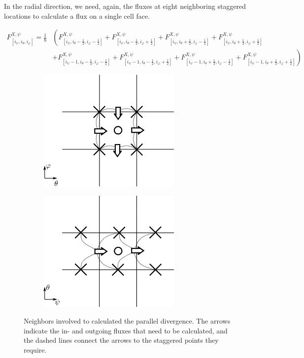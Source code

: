 In the radial direction, we need, again, the fluxes at eight neighboring staggered locations to calculate a flux on a single cell face. 

\begin{align*}
	F_{[i_\psi,i_\theta, i_\varphi]}^{X,\psi} = \frac{1}{8}&\left(
	F_{[i_\psi,i_\theta-\frac{1}{2}, i_\varphi-\frac{1}{2}]}^{X,\psi} + 
	F_{[i_\psi,i_\theta-\frac{1}{2}, i_\varphi+\frac{1}{2}]}^{X,\psi} +
	F_{[i_\psi,i_\theta+\frac{1}{2}, i_\varphi-\frac{1}{2}]}^{X,\psi} + 
	F_{[i_\psi,i_\theta+\frac{1}{2}, i_\varphi+\frac{1}{2}]}^{X,\psi} 
	\right. \nonumber \\ &+\left.
	F_{[i_\psi-1,i_\theta-\frac{1}{2}, i_\varphi-\frac{1}{2}]}^{X,\psi} + 
	F_{[i_\psi-1,i_\theta-\frac{1}{2}, i_\varphi+\frac{1}{2}]}^{X,\psi} + 
	F_{[i_\psi-1,i_\theta+\frac{1}{2}, i_\varphi-\frac{1}{2}]}^{X,\psi} + 
	F_{[i_\psi-1,i_\theta+\frac{1}{2}, i_\varphi+\frac{1}{2}]}^{X,\psi} 	
	\right)
\end{align*}

\begin{figure}[H]
	\centering
	\begin{subfigure}[t]{0.48\textwidth}
		\centering
		\includegraphics[height=60mm]{schemes/DivStencil_ThetaPhi.jpg}
		\label{fig:Impl_DivPara_ThetaPhi}
	\end{subfigure}
	\begin{subfigure}[t]{0.48\textwidth}
		\centering
		\includegraphics[height=60mm]{schemes/DivStencil_PsiTheta.jpg}
		\label{fig:Impl_DivPara_PsiTheta}
	\end{subfigure}
	\caption{Neighbors involved to calculated the parallel divergence. The arrows indicate the in- and outgoing fluxes that need to be calculated, and the dashed lines connect the arrows to the staggered points they require.}
	\label{fig:Impl_DivPara}
\end{figure}



